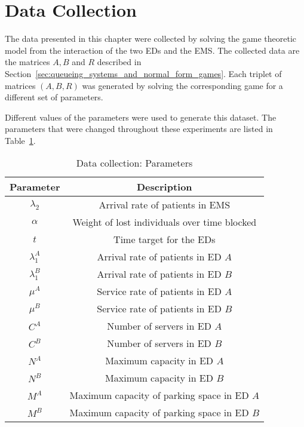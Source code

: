 \section{Data Collection}\label{sec:data_collection}

The data presented in this chapter were collected by solving the game theoretic
model from the interaction of the two EDs and the EMS.
The collected data are the matrices \(A, B\) and \(R\) described
in Section~\ref{sec:queueing_systems_and_normal_form_games}.
Each triplet of matrices \((A, B, R)\) was generated by solving the
corresponding game for a different set of parameters.

Different values of the parameters were used to generate this dataset.
The parameters that were changed throughout these experiments are listed in
Table~\ref{tab:data_collection_parameters}.

\begin{table}[H]
    \centering
    \caption{Data collection: Parameters}
    \begin{tabular}{|c|c|}
        \hline
        Parameter & Description \\
        \hline
        \(\lambda_2\) & Arrival rate of patients in EMS \\
        \(\alpha\) & Weight of lost individuals over time blocked \\
        \(t\) & Time target for the EDs \\
        \(\lambda_1^A\) & Arrival rate of patients in ED \(A\) \\
        \(\lambda_1^B\) & Arrival rate of patients in ED \(B\) \\
        \(\mu^A\) & Service rate of patients in ED \(A\) \\
        \(\mu^B\) & Service rate of patients in ED \(B\) \\
        \(C^A\) & Number of servers in ED \(A\) \\
        \(C^B\) & Number of servers in ED \(B\) \\
        \(N^A\) & Maximum capacity in ED \(A\) \\
        \(N^B\) & Maximum capacity in ED \(B\) \\
        \(M^A\) & Maximum capacity of parking space in ED \(A\) \\
        \(M^B\) & Maximum capacity of parking space in ED \(B\) \\
        \hline
    \end{tabular}
    \label{tab:data_collection_parameters}
\end{table}

